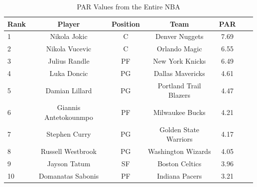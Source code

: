 \documentclass[12pt]{article}
\begin{document}
\begin{table}[H]
  \caption{PAR Values from the Entire NBA}
  \label{tab:NBAtable}
\centering
\begin{tabular}[t]{lcccccc}
  \toprule
  Rank & Player & Position & Team & PAR\\
  \midrule
 1 & Nikola Jokic & C & Denver Nuggets & 7.69\\
 2 & Nikola Vucevic & C & Orlando Magic & 6.55\\
 3 & Julius Randle & PF & New York Knicks & 6.49\\
 4 & Luka Doncic & PG & Dallas Mavericks & 4.61\\
 5 & Damian Lillard & PG & Portland Trail Blazers & 4.47\\
 6 & Giannis Antetokounmpo & PF & Milwaukee Bucks & 4.21\\
 7 & Stephen Curry & PG & Golden State Warriors & 4.17\\
 8 & Russell Westbrook & PG & Washington Wizards & 4.05\\
 9 & Jayson Tatum & SF & Boston Celtics & 3.96\\
 10 & Domanatas Sabonis & PF & Indiana Pacers & 3.21\\
 \bottomrule
\end{tabular}
\end{table}
\end{document}
